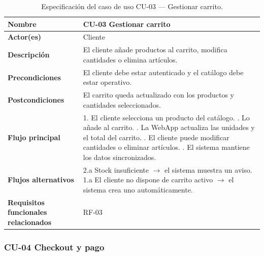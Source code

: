 \begin{table}[H]
\centering
\small
\begin{tabular}{|m{}|m{}|}
\hline
\textbf{Nombre} & CU-03 Gestionar carrito \\ \hline
\textbf{Actor(es)} & Cliente \\ \hline
\textbf{Descripción} & El cliente añade productos al carrito, modifica cantidades o elimina artículos. \\ \hline
\textbf{Precondiciones} & El cliente debe estar autenticado y el catálogo debe estar operativo. \\ \hline
\textbf{Postcondiciones} & El carrito queda actualizado con los productos y cantidades seleccionados. \\ \hline
\textbf{Flujo principal} & 1. El cliente selecciona un producto del catálogo. \newline 2. Lo añade al carrito. \newline 3. La WebApp actualiza las unidades y el total del carrito. \newline 4. El cliente puede modificar cantidades o eliminar artículos. \newline 5. El sistema mantiene los datos sincronizados. \\ \hline
\textbf{Flujos alternativos} & 2.a Stock insuficiente $\rightarrow$ el sistema muestra un aviso. \newline 1.a El cliente no dispone de carrito activo $\rightarrow$ el sistema crea uno automáticamente. \\ \hline
\textbf{Requisitos funcionales relacionados} & RF-03 \\ \hline
\end{tabular}
\caption{Especificación del caso de uso CU-03 — Gestionar carrito.}
\end{table}

\clearpage

\subsubsection{CU-04 Checkout y pago}

